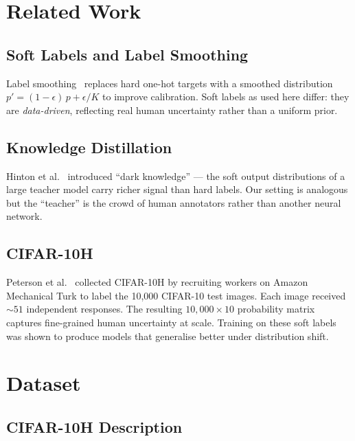 \documentclass[11pt,a4paper]{article}
\begin{document}
\section{Related Work}

\subsection{Soft Labels and Label Smoothing}

Label smoothing~\cite{szegedy2016rethinking} replaces hard one-hot targets
with a smoothed distribution $p' = (1-\epsilon)\,p + \epsilon/K$ to improve
calibration.
Soft labels as used here differ: they are \emph{data-driven}, reflecting real
human uncertainty rather than a uniform prior.

\subsection{Knowledge Distillation}

Hinton et al.~\cite{hinton2015distilling} introduced ``dark knowledge'' —
the soft output distributions of a large teacher model carry richer signal
than hard labels.
Our setting is analogous but the ``teacher'' is the crowd of human annotators
rather than another neural network.

\subsection{CIFAR-10H}

Peterson et al.~\cite{peterson2019human} collected CIFAR-10H by recruiting
workers on Amazon Mechanical Turk to label the 10,000 CIFAR-10 test images.
Each image received ${\sim}51$ independent responses.
The resulting $10{,}000 \times 10$ probability matrix captures fine-grained
human uncertainty at scale.
Training on these soft labels was shown to produce models that generalise
better under distribution shift.

\section{Dataset}

\subsection{CIFAR-10H Description}
\end{document}
